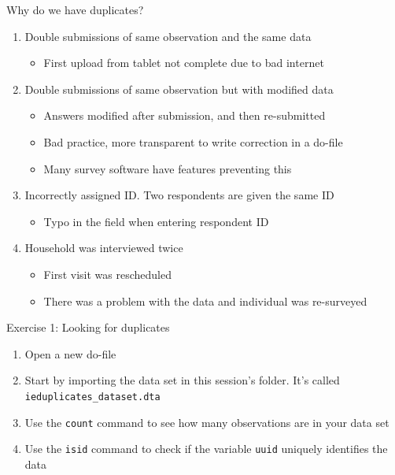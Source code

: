\documentclass[aspectratio=169]{beamer}
\begin{document}
\begin{frame}{Why do we have duplicates?}
    \begin{enumerate}
        \item Double submissions of same observation and the same data
         \begin{itemize}
            \item First upload from tablet not complete due to bad internet
        \end{itemize}
        \item Double submissions of same observation but with modified data
         \begin{itemize}
            \item Answers modified after submission, and then re-submitted
            \item Bad practice, more transparent to write correction in a do-file
            \item Many survey software have features preventing this
        \end{itemize}
        \item Incorrectly assigned ID. Two respondents are given the same ID
         \begin{itemize}
            \item Typo in the field when entering respondent ID
        \end{itemize}
        \item Household was interviewed twice
        \begin{itemize}
            \item First visit was rescheduled
            \item There was a problem with the data and individual was re-surveyed
        \end{itemize}
    \end{enumerate}   
\end{frame}

\begin{frame}{Exercise 1: Looking for duplicates}
    \begin{enumerate}
        \item Open a new do-file
        \item Start by importing the data set in this session's folder. It's called \texttt{ieduplicates\_dataset.dta}
        \item Use the \texttt{count} command to see how many observations are in your data set
        \item Use the \texttt{isid} command to check if the variable \texttt{uuid} uniquely identifies the data
    \end{enumerate}
\end{frame}
\end{document}
